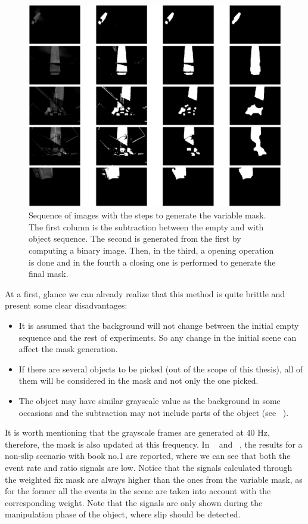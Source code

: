 \begin{figure}[H]
    \centering
    \includegraphics[width=\textwidth]{resources/images/var_mask_hb1}
    \caption{Sequence of images with the steps to generate the variable mask. The first column is the subtraction between the empty and with object sequence. The second is generated from the first by computing a binary image. Then, in the third, a opening operation is done and in the fourth a closing one is performed to generate the final mask.}\label{fig:var_mask_hb1}
\end{figure}

At a first, glance we can already realize that this method is quite brittle and present some clear disadvantages:

\begin{itemize}
	\item It is assumed that the background will not change between the initial empty sequence and the rest of experiments. So any change in the initial scene can affect the mask generation.
	\item If there are several objects to be picked (out of the scope of this thesis), all of them will be considered in the mask and not only the one picked.
	\item The object may have similar grayscale value as the background in some occasions and the subtraction may not include parts of the object (see  ~).
\end{itemize}

It is worth mentioning that the grayscale frames are generated at 40 Hz, therefore, the mask is also updated at this frequency. In ~ and ~, the results for a non-slip scenario with book no.1 are reported, where we can see that both the event rate and ratio signals are low. Notice that the signals calculated through the weighted fix mask are always higher than the ones from the variable mask, as for the former all the events in the scene are taken into account with the corresponding weight. Note that the signals are only shown during the manipulation phase of the object, where slip should be detected.\\

